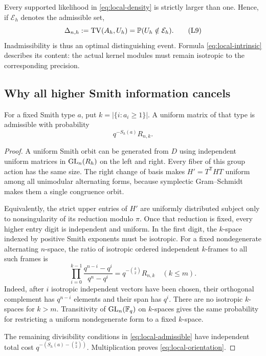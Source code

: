 Every supported likelihood in \eqref{eq:local-density} is strictly larger
than one. Hence, if \(\mathcal E_h\) denotes the admissible set,
\[
 \Delta_{n,h}:=\operatorname{TV}(A_h,U_h)=\mathbb P(U_h\notin\mathcal E_h).
 \tag{L9}\label{eq:local-support-TV}
\]
Inadmissibility is thus an optimal distinguishing event.
Formula \eqref{eq:local-intrinsic} describes its content: the actual
kernel modules must remain isotropic to the corresponding precision.

\subsection{Why all higher Smith information cancels}

\begin{lemma}\label{lem:local-orientation}
For a fixed Smith type \(a\), put \(k=|\{i:a_i\ge1\}|\).
A uniform matrix of that type is admissible with probability
\[
 q^{-S_h(a)}R_{n,k}.
 \tag{L10}\label{eq:local-orientation}
\]
\end{lemma}

\begin{proof}
A uniform Smith orbit can be generated from \(D\) using independent
uniform matrices in \(\operatorname{GL}_n(R_h)\) on the left and right.
Every fiber of this group action has the same size. The right change
of basis makes \(H'=T^{\mathsf T}HT\) uniform among all unimodular
alternating forms, because symplectic Gram--Schmidt makes them a
single congruence orbit.

Equivalently, the strict upper entries of \(H'\) are uniformly
distributed subject only to nonsingularity of its reduction modulo
\(\pi\). Once that reduction is fixed, every higher entry digit is
independent and uniform. In the first digit, the \(k\)-space indexed by
positive Smith exponents must be isotropic.
For a fixed nondegenerate alternating \(n\)-space, the ratio of
isotropic ordered independent \(k\)-frames to all such frames is
\[
 \prod_{i=0}^{k-1}
 \frac{q^{n-i}-q^i}{q^n-q^i}
   =q^{-\binom k2}R_{n,k}\quad(k\le m).
 \tag{L11}\label{eq:local-isotropic-count}
\]
Indeed, after \(i\) isotropic independent vectors have been chosen,
their orthogonal complement has \(q^{n-i}\) elements and their span
has \(q^i\). There are no isotropic \(k\)-spaces for \(k>m\).
Transitivity of \(\operatorname{GL}_n(\mathbb F_q)\) on \(k\)-spaces gives the same
probability for restricting a uniform nondegenerate form to a fixed
\(k\)-space.

The remaining divisibility conditions in \eqref{eq:local-admissible}
have independent total cost
\(q^{-(S_h(a)-\binom k2)}\).
Multiplication proves \eqref{eq:local-orientation}.
\end{proof}

